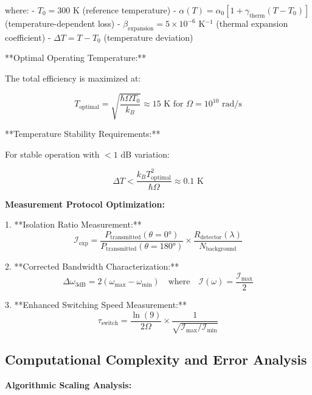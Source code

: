 \documentclass[11pt]{article}
\begin{document}
where:
- $T_0 = 300$ K (reference temperature)
- $\alpha(T) = \alpha_0 [1 + \gamma_{\text{therm}}(T - T_0)]$ (temperature-dependent loss)
- $\beta_{\text{expansion}} = 5 \times 10^{-6}$ K$^{-1}$ (thermal expansion coefficient)
- $\Delta T = T - T_0$ (temperature deviation)

**Optimal Operating Temperature:**

The total efficiency is maximized at:

\begin{equation}
T_{\text{optimal}} = \sqrt{\frac{\hbar\Omega T_0}{k_B}} \approx 15\text{ K for }\Omega = 10^{10}\text{ rad/s}
\end{equation}

**Temperature Stability Requirements:**

For stable operation with $< 1$ dB variation:

\begin{equation}
\Delta T < \frac{k_B T_{\text{optimal}}^2}{\hbar\Omega} \approx 0.1\text{ K}
\end{equation}

\textbf{Measurement Protocol Optimization:}

1. **Isolation Ratio Measurement:**
   \begin{equation}
   \mathcal{I}_{\text{exp}} = \frac{P_{\text{transmitted}}(\theta = 0°)}{P_{\text{transmitted}}(\theta = 180°)} \times \frac{R_{\text{detector}}(\lambda)}{N_{\text{background}}}
   \end{equation}

2. **Corrected Bandwidth Characterization:**
   \begin{equation}
   \Delta\omega_{3\text{dB}} = 2(\omega_{\text{max}} - \omega_{\text{min}}) \quad \text{where} \quad \mathcal{I}(\omega) = \frac{\mathcal{I}_{\text{max}}}{2}
   \end{equation}

3. **Enhanced Switching Speed Measurement:**
   \begin{equation}
   \tau_{\text{switch}} = \frac{\ln(9)}{2\Omega} \times \frac{1}{\sqrt{\mathcal{I}_{\text{max}}/\mathcal{I}_{\text{min}}}}
   \end{equation}

\subsection{Computational Complexity and Error Analysis}

\textbf{Algorithmic Scaling Analysis:}
\end{document}
